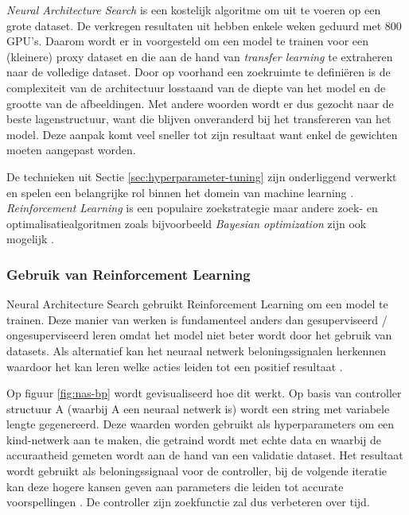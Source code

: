 \textit{Neural Architecture Search} is een kostelijk algoritme om uit te voeren op een grote dataset. De verkregen resultaten uit \textcite{ZophL2016} hebben enkele weken geduurd met 800 GPU's. Daarom wordt er in \textcite{Zoph2017} voorgesteld om een model te trainen voor een (kleinere) proxy dataset en die aan de hand van \textit{transfer learning} te extraheren naar de volledige dataset. Door op voorhand een zoekruimte te definiëren is de complexiteit van de architectuur losstaand van de diepte van het model en de grootte van de afbeeldingen. Met andere woorden wordt er dus gezocht naar de beste lagenstructuur, want die blijven onveranderd bij het transfereren van het model. Deze aanpak komt veel sneller tot zijn resultaat want enkel de gewichten moeten aangepast worden.

De technieken uit Sectie \ref{sec:hyperparameter-tuning} zijn onderliggend verwerkt en spelen een belangrijke rol binnen het domein van machine learning \autocite{ZophL2016}. \textit{Reinforcement Learning} is een populaire zoekstrategie maar andere zoek- en optimalisatiealgoritmen zoals bijvoorbeeld \textit{Bayesian optimization} zijn ook mogelijk \autocite{Elsken2019}.

\subsubsection{Gebruik van Reinforcement Learning}
\label{subsubsec:nas-reinforcement}

Neural Architecture Search gebruikt Reinforcement Learning om een model te trainen. Deze manier van werken is fundamenteel anders dan gesuperviseerd / ongesuperviseerd leren omdat het model niet beter wordt door het gebruik van datasets. Als alternatief kan het neuraal netwerk beloningssignalen herkennen waardoor het kan leren welke acties leiden tot een positief resultaat \autocite{Lievens2019}.

Op figuur \ref{fig:nas-bp} wordt gevisualiseerd hoe dit werkt. Op basis van controller structuur A (waarbij A een neuraal netwerk is) wordt een string met variabele lengte gegenereerd. Deze waarden worden gebruikt als hyperparameters om een kind-netwerk aan te maken, die getraind wordt met echte data en waarbij de accuraatheid gemeten wordt aan de hand van een validatie dataset. Het resultaat wordt gebruikt als beloningssignaal voor de controller, bij de volgende iteratie kan deze hogere kansen geven aan parameters die leiden tot accurate voorspellingen \autocite{ZophL2016}. De controller zijn zoekfunctie zal dus verbeteren over tijd.

